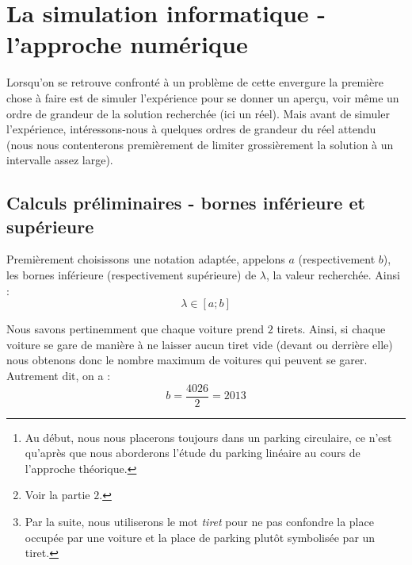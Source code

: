\documentclass[a4paper,francais,11pt]{article}
\begin{document}
\begin{abstract}
Dans ce papier nous présentons nos recherches sur l'un des sujets du chercheur Frédéric TÉSTARD. Le problème suivant à pour but de trouver, en moyenne, le nombre de voitures qui se garent dans un parking circulaire\footnote{Au début, nous nous placerons toujours dans un parking circulaire, ce n'est qu'après que nous aborderons l'étude du parking linéaire au cours de l'approche théorique.} ou linéaire (les deux étant liés par une formule\footnote{Voir la partie $2$.} qui sera mise en évidence dans la section $2$) contenant 4026 places\footnote{Par la suite, nous utiliserons le mot \emph{tiret} pour ne pas confondre la place occupée par une voiture et la place de parking plutôt symbolisée par un tiret.}. 

De plus, on sait que chaque voiture prend 2 tirets et que le parking se rempli jusqu'à ce qu'aucune voiture supplémentaire puisse se garer (nous dirons alors que le parking est \emph{saturé}). Le problème ci-contre prend alors une tout autre ampleur...
\end{abstract}
\vspace*{1cm}

\begin{center}
{\scriptsize \tableofcontents}
\end{center}

\small
\clearpage

\section{La simulation informatique - l'approche numérique}
Lorsqu'on se retrouve confronté à un problème de cette envergure la première chose à faire est de simuler l'expérience pour se donner un aperçu, voir même un ordre de grandeur de la solution recherchée (ici un réel). Mais avant de simuler l'expérience, intéressons-nous à quelques ordres de grandeur du réel attendu (nous nous contenterons premièrement de limiter grossièrement la solution à un intervalle assez large).
\subsection{Calculs préliminaires - bornes inférieure et supérieure}
Premièrement choisissons une notation adaptée, appelons $a$ (respectivement $b$), les bornes inférieure (respectivement supérieure) de $\lambda$, la valeur recherchée. Ainsi : 
\[\lambda \in [a;b]\]

Nous savons pertinemment que chaque voiture prend $2$ tirets. Ainsi, si chaque voiture se gare de manière à ne laisser aucun tiret vide (devant ou derrière elle) nous obtenons donc le nombre maximum de voitures qui peuvent se garer. Autrement dit, on a : 
\[b=\frac{4026}{2}=2013\]
\end{document}
